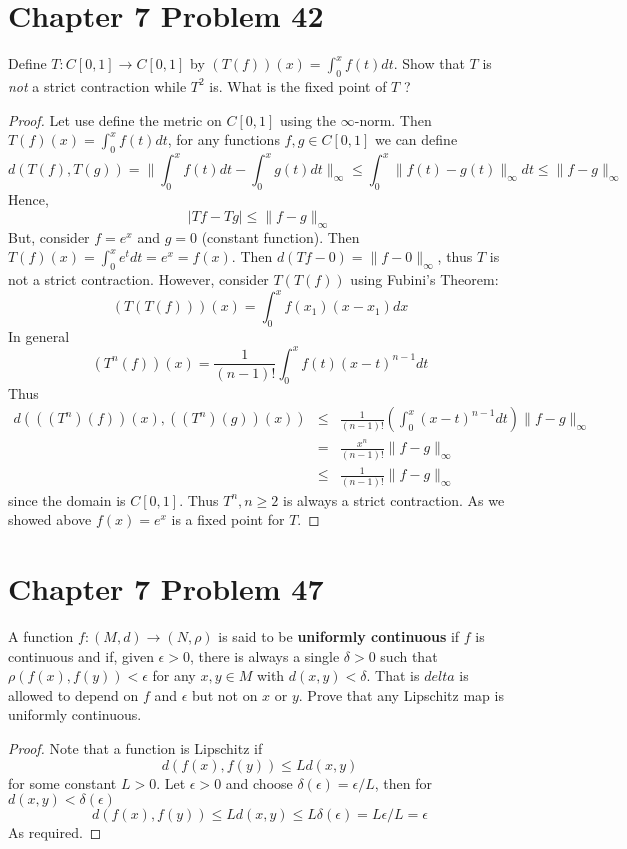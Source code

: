 \documentclass{article}
\newtheorem{proof}{Proof}
\def\ge{\geqslant}
\def\le{\leqslant}
\def\to{\rightarrow}
\begin{document}
\section{Chapter 7 Problem 42}
Define $T: C[0,1]\to C[0,1]$ by $(T(f))(x)=\int_0^x f(t)dt$.
Show that $T$ is \emph{not} a strict contraction while $T^2$ is.
What is the fixed point of $T$ ?
\begin{proof}
Let use define the metric on $C[0,1]$ using the $\infty$-norm.
Then $T(f)(x) = \int_0^x f(t)dt$, for any functions $f,g\in C[0,1]$
we can define 
\[
d(T(f),T(g)) = \|\int_0^x f(t)dt - \int_0^x g(t)dt\|_\infty \le 
\int_0^x \|f(t)-g(t)\|_\infty dt \le \|f-g\|_\infty
\]
Hence,
\[
|Tf - Tg| \le \|f-g\|_\infty
\]
But, consider $f=e^x$ and $g=0$ (constant function). 
Then $T(f)(x)=\int_0^x e^tdt=e^x=f(x)$.
Then
$d(Tf-0)=\|f-0\|_\infty$, thus $T$ is not a strict contraction. However,
consider $T(T(f))$ using Fubini's Theorem:
\[
(T(T(f)))(x) = \int_0^x f(x_1)(x-x_1)dx
\]
In general
\[
(T^n(f))(x) = \frac{1}{(n-1)!} \int_0^x f(t)(x-t)^{n-1} dt
\]
Thus 
\begin{eqnarray}
d(((T^n)(f))(x), ((T^n)(g))(x)) & \le & \frac{1}{(n-1)!} 
\left(\int_0^x (x-t)^{n-1} dt\right) \|f-g\|_\infty \nonumber \\
  & = & \frac{x^n}{(n-1)!} \|f-g\|_\infty \nonumber \\
  & \le & \frac{1}{(n-1)!} \|f-g\|_\infty \nonumber 
\end{eqnarray}
since the domain is $C[0,1]$. Thus $T^n, n\ge 2$ is always
a strict contraction.
As we showed above $f(x)=e^x$ is a fixed point for $T$.
\end{proof}

\section{Chapter 7 Problem 47} A function $f:(M,d)\to (N,\rho)$
is said to be {\bf uniformly continuous} if $f$ is continuous
and if, given $\epsilon>0$, there is always a single $\delta>0$
such that $\rho(f(x),f(y))<\epsilon$ for any $x,y\in M$ with
$d(x,y)<\delta$. That is $delta$ is allowed to depend on $f$ and
$\epsilon$ but not on $x$ or $y$. Prove that any Lipschitz map
is uniformly continuous.
\begin{proof}
Note that a function is Lipschitz if
\[
d(f(x),f(y)) \le L d(x,y)
\]
for some constant $L>0$. Let $\epsilon>0$ and 
choose $\delta(\epsilon)=\epsilon/L$, then for $d(x,y)<\delta(\epsilon)$
\[
d(f(x),f(y)) \le L d(x,y) \le L \delta(\epsilon) = L \epsilon/L = \epsilon
\]
As required.
\end{proof}
\end{document}

